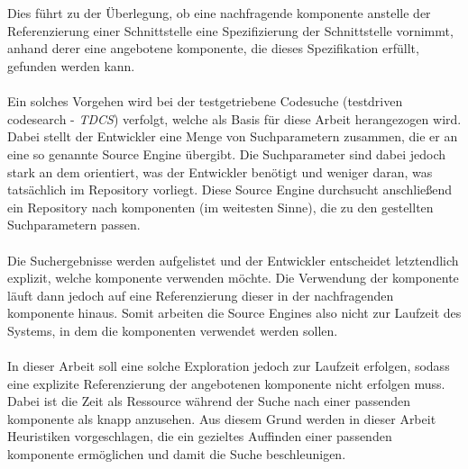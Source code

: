 \\\\
Dies führt zu der Überlegung, ob eine nachfragende \gls{komponente} anstelle der Referenzierung einer Schnittstelle eine Spezifizierung der Schnittstelle vornimmt, anhand derer eine angebotene \gls{komponente}, die dieses Spezifikation erfüllt, gefunden werden kann.
\\\\
Ein solches Vorgehen wird bei der testgetriebene Codesuche (testdriven codesearch - \emph{TDCS}) verfolgt, welche als Basis für diese Arbeit herangezogen wird. Dabei stellt der Entwickler eine Menge von Suchparametern zusammen, die er an eine so genannte Source \Gls{Engine} übergibt. Die Suchparameter sind dabei jedoch stark an dem orientiert, was der Entwickler benötigt und weniger daran, was tatsächlich im Repository vorliegt. Diese Source \Gls{Engine} durchsucht anschließend ein Repository nach \gls{komponente}n (im weitesten Sinne), die zu den gestellten Suchparametern passen. 
\\\\
Die Suchergebnisse werden aufgelistet und der Entwickler entscheidet letztendlich explizit, welche \gls{komponente} verwenden möchte. Die Verwendung der \gls{komponente} läuft dann jedoch auf eine Referenzierung dieser in der nachfragenden \gls{komponente} hinaus. Somit arbeiten die Source \Gls{Engine}s also nicht zur Laufzeit des Systems, in dem die \gls{komponente}n verwendet werden sollen.
\\\\
In dieser Arbeit soll eine solche Exploration jedoch zur Laufzeit erfolgen, sodass eine explizite Referenzierung der angebotenen \gls{komponente} nicht erfolgen muss. Dabei ist die Zeit als Ressource während der Suche nach einer passenden \gls{komponente} als knapp anzusehen. Aus diesem Grund werden in dieser Arbeit Heuristiken vorgeschlagen, die ein gezieltes Auffinden einer passenden \gls{komponente} ermöglichen und damit die Suche beschleunigen.

